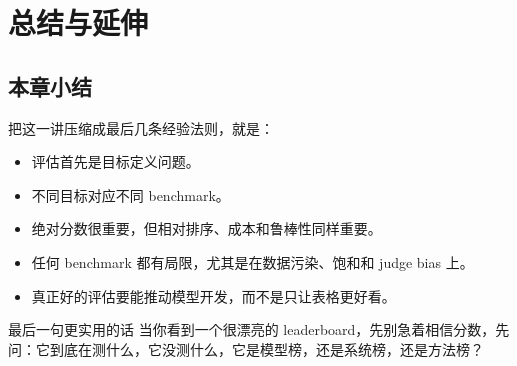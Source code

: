 \section{总结与延伸}

\subsection{本章小结}

把这一讲压缩成最后几条经验法则，就是：
\begin{itemize}
    \item 评估首先是目标定义问题。
    \item 不同目标对应不同 benchmark。
    \item 绝对分数很重要，但相对排序、成本和鲁棒性同样重要。
    \item 任何 benchmark 都有局限，尤其是在数据污染、饱和和 judge bias 上。
    \item 真正好的评估要能推动模型开发，而不是只让表格更好看。
\end{itemize}

\begin{importantbox}{最后一句更实用的话}
当你看到一个很漂亮的 leaderboard，先别急着相信分数，先问：它到底在测什么，它没测什么，它是模型榜，还是系统榜，还是方法榜？
\end{importantbox}


